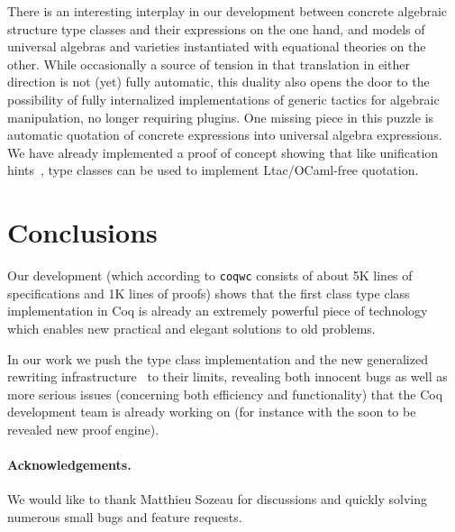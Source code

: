 \documentclass{llncs}
\begin{document}
There is an interesting interplay in our development between concrete algebraic structure type classes and their expressions on the one hand, and models of universal algebras and varieties instantiated with equational theories on the other. While occasionally a source of tension in that translation in either direction is not (yet) fully automatic, this duality also opens the door to the possibility of fully internalized implementations of generic tactics for algebraic manipulation, no longer requiring plugins. One missing piece in this puzzle is automatic quotation of concrete expressions into universal algebra expressions. We have already implemented a proof of concept showing that like unification hints~\cite{Hints}, type classes can be used to implement Ltac/OCaml-free quotation.


%

\section{Conclusions}

Our development (which according to \texttt{coqwc} consists of about 5K lines of specifications and 1K lines of proofs) shows that the first class type class implementation in Coq is already an extremely powerful piece of technology which enables new practical and elegant solutions to old problems.

In our work we push the type class implementation and the new generalized rewriting infrastructure~\cite{Setoid-rewrite} to their limits, revealing both innocent bugs as well as more serious issues (concerning both efficiency and functionality) that the Coq development team is already working on (for instance with the soon to be revealed new proof engine).




\paragraph{Acknowledgements.}
We would like to thank Matthieu Sozeau for discussions and quickly solving numerous small bugs and
feature requests.


\end{document}
